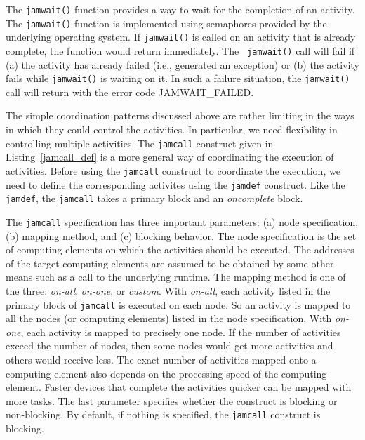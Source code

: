 \documentclass[11pt]{article}
\begin{document}

The {\tt jamwait()} function provides a way to wait for the completion of an
activity. The {\tt jamwait()} function is implemented using semaphores provided
by the underlying operating system. If {\tt jamwait()} is called on an activity
that is already complete, the function would return immediately. The {\tt
jamwait()} call will fail if (a) the activity has already failed (i.e.,
generated an exception) or (b) the activity fails while {\tt jamwait()} is
waiting on it.  In such a failure situation, the {\tt jamwait()} call will
return with the error code JAMWAIT\_FAILED.


The simple coordination patterns discussed above are rather limiting in the ways
in which they could control the activities. In particular, we need flexibility
in controlling multiple activities. The {\tt jamcall} construct given in
Listing~\ref{jamcall_def} is a more general way of coordinating the execution of
activities. Before using the {\tt jamcall} construct to coordinate the
execution, we need to define the corresponding activites using the {\tt jamdef}
construct. Like the {\tt jamdef}, the {\tt jamcall} takes a primary block and an
{\em oncomplete} block.

The {\tt jamcall} specification has three important parameters: (a) node
specification, (b) mapping method, and (c) blocking behavior. The node
specification is the set of computing elements on which the activities should be
executed. The addresses of the target computing elements are assumed to be
obtained by some other means such as a call to the underlying runtime. The
mapping method is one of the three: {\em on-all}, {\em on-one}, or {\em custom}.
With {\em on-all}, each activity listed in the primary block of {\tt jamcall} is
executed on each node. So an activity is mapped to all the nodes (or computing
elements) listed in the node specification. With {\em on-one}, each activity is
mapped to precisely one node. If the number of activities exceed the number of
nodes, then some nodes would get more activities and others would receive less.
The exact number of activities mapped onto a computing element also depends on
the processing speed of the computing element. Faster devices that complete the
activities quicker can be mapped with more tasks. The last parameter specifies
whether the construct is blocking or non-blocking. By default, if nothing is
specified, the {\tt jamcall} construct is blocking.
\end{document}
